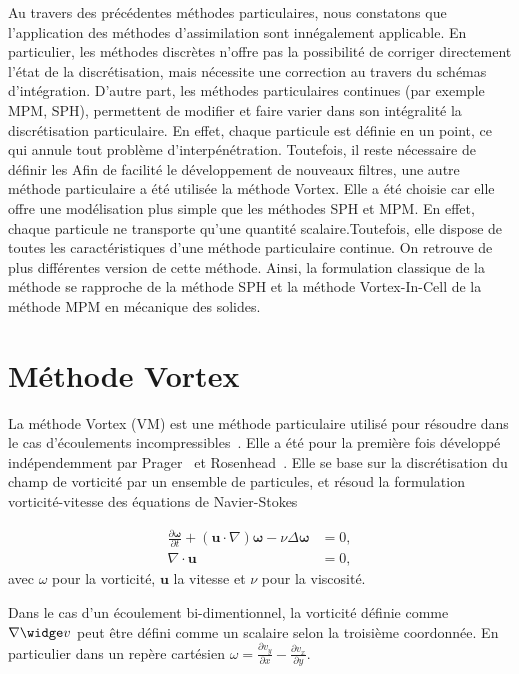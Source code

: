 Au travers des précédentes méthodes particulaires, nous constatons que l'application des méthodes d'assimilation sont innégalement applicable. En particulier, les méthodes discrètes n'offre pas la possibilité de corriger directement l'état de la discrétisation, mais nécessite une correction au travers du schémas d'intégration. D'autre part, les méthodes particulaires continues (par exemple MPM, SPH), permettent de modifier et faire varier dans son intégralité la discrétisation particulaire. En effet, chaque particule est définie en un point, ce qui annule tout problème d'interpénétration. Toutefois, il reste nécessaire de définir les
Afin de facilité le développement de nouveaux filtres, une autre méthode particulaire a été utilisée la méthode Vortex. Elle a été choisie car elle offre une modélisation plus simple que les méthodes SPH et MPM. En effet, chaque particule ne transporte qu'une quantité scalaire.Toutefois, elle dispose de toutes les caractéristiques d'une méthode particulaire continue. On retrouve de plus différentes version de cette méthode. Ainsi, la formulation classique de la méthode se rapproche de la méthode SPH et la méthode Vortex-In-Cell de la méthode MPM en mécanique des solides.

\section{Méthode Vortex}

La méthode Vortex (VM) est une méthode particulaire utilisé pour résoudre  dans le cas d'écoulements incompressibles~\cite{Cottet_Koumoutsakos_2000}. Elle a été pour la première fois développé indépendemment par Prager~\cite{prager1928druckverteilung} et Rosenhead~\cite{rosenhead1931formation}. Elle se base sur la discrétisation du champ de vorticité par un ensemble de particules, et résoud la formulation vorticité-vitesse des équations de Navier-Stokes

\begin{eqnarray*}
    \frac{\partial \bm \omega}{\partial t} + (\bm{u} \cdot \nabla) \bm \omega - \nu \Delta \bm \omega & = 0, \\
    \nabla \cdot \bm u  & = 0,
\end{eqnarray*}avec $\omega$ pour la vorticité, $\bm{u}$ la vitesse et $\nu$ pour la viscosité.

Dans le cas d'un écoulement bi-dimentionnel, la vorticité définie comme $\nabla \widge v$ peut être défini comme un scalaire selon la troisième coordonnée. En particulier dans un repère cartésien $\omega = \frac{\partial v_y}{\partial x} - \frac{\partial v_x}{\partial y}$.

